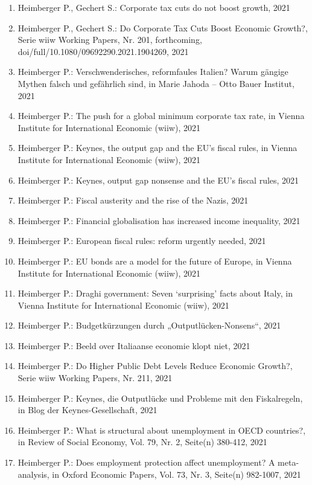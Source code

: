 \begin{enumerate}
	 \item Heimberger P., Gechert S.: Corporate tax cuts do not boost growth, 2021
	 \item Heimberger P., Gechert S.: Do Corporate Tax Cuts Boost Economic Growth?, Serie wiiw Working Papers, Nr. 201, forthcoming, doi/full/10.1080/09692290.2021.1904269, 2021
	 \item Heimberger P.: Verschwenderisches, reformfaules Italien? Warum gängige Mythen falsch und gefährlich sind, in Marie Jahoda – Otto Bauer Institut, 2021
	 \item Heimberger P.: The push for a global minimum corporate tax rate, in Vienna Institute for International Economic (wiiw), 2021
	 \item Heimberger P.: Keynes, the output gap and the EU’s fiscal rules, in Vienna Institute for International Economic (wiiw), 2021
	 \item Heimberger P.: Keynes, output gap nonsense and the EU’s fiscal rules, 2021
	 \item Heimberger P.: Fiscal austerity and the rise of the Nazis, 2021
	 \item Heimberger P.: Financial globalisation has increased income inequality, 2021
	 \item Heimberger P.: European fiscal rules: reform urgently needed, 2021
	 \item Heimberger P.: EU bonds are a model for the future of Europe, in Vienna Institute for International Economic (wiiw), 2021
	 \item Heimberger P.: Draghi government: Seven ‘surprising’ facts about Italy, in Vienna Institute for International Economic (wiiw), 2021
	 \item Heimberger P.: Budgetkürzungen durch „Outputlücken-Nonsens“, 2021
	 \item Heimberger P.: Beeld over Italiaanse economie klopt niet, 2021
	 \item Heimberger P.: Do Higher Public Debt Levels Reduce Economic Growth?, Serie wiiw Working Papers, Nr. 211, 2021
	 \item Heimberger P.: Keynes, die Outputlücke und Probleme mit den Fiskalregeln, in Blog der Keynes-Gesellschaft, 2021
	 \item Heimberger P.: What is structural about unemployment in OECD countries?, in Review of Social Economy, Vol. 79, Nr. 2, Seite(n) 380-412, 2021
	 \item Heimberger P.: Does employment protection affect unemployment? A meta-analysis, in Oxford Economic Papers, Vol. 73, Nr. 3, Seite(n) 982-1007, 2021

\end{enumerate}

